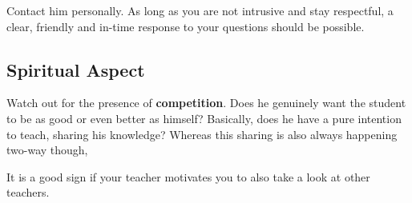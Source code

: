 Contact him personally.
As long as you are not intrusive and stay respectful, a clear, friendly and in-time response to your questions should be possible.

\subsection{Spiritual Aspect}\label{subsec:spiritual-aspect}

Watch out for the presence of \textbf{competition}.
Does he genuinely want the student to be as good or even better as himself?
Basically, does he have a pure intention to teach, sharing his knowledge?
Whereas this sharing is also always happening two-way though,

It is a good sign if your teacher motivates you to also take a look at other teachers.
